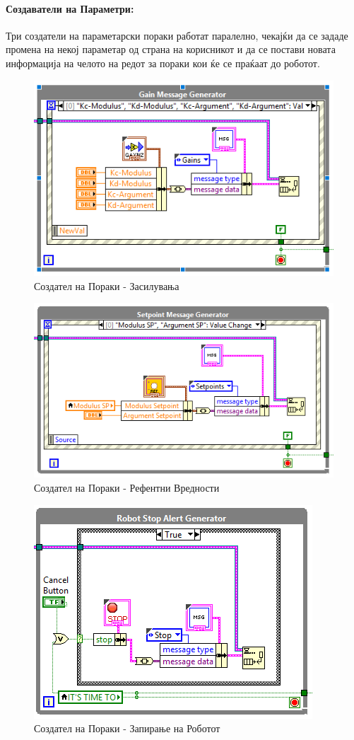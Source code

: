\documentclass[12pt]{article}
\begin{document}
    \paragraph{Создаватели на Параметри:\\} %
      Три создатели на параметарски пораки работат паралелно, чекајќи да се зададе промена на некој параметар од страна на корисникот и да се постави новата информација на челото на редот за пораки кои ќе се праќаат до роботот.
      \begin{figure}[!h]
          \centering
          \includegraphics[width=0.75\linewidth]{./images/gain_message_generator.png}
          \caption{Создател на Пораки - Засилувања}
        \end{figure}
        \begin{figure}[!h]
          \centering
          \includegraphics[width=0.75\linewidth]{./images/setpoint_message_generator.png}
          \caption{Создател на Пораки - Рефентни Вредности}
        \end{figure}
        \begin{figure}[!h]
          \centering
          \includegraphics[width=0.75\linewidth]{./images/robot_stop_generator.png}
          \caption{Создател на Пораки - Запирање на Роботот}
        \end{figure}
\end{document}
